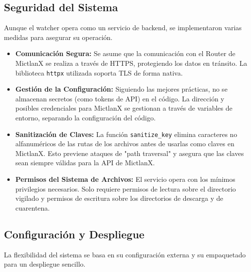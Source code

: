 \subsection{Seguridad del Sistema}
Aunque el watcher opera como un servicio de backend, se implementaron varias medidas para asegurar su operación.
\begin{itemize}
    \item \textbf{Comunicación Segura:} Se asume que la comunicación con el Router de MictlanX se realiza a través de HTTPS, protegiendo los datos en tránsito. La biblioteca \texttt{httpx} utilizada soporta TLS de forma nativa.
    \item \textbf{Gestión de la Configuración:} Siguiendo las mejores prácticas, no se almacenan secretos (como tokens de API) en el código. La dirección y posibles credenciales para MictlanX se gestionan a través de variables de entorno, separando la configuración del código.
    \item \textbf{Sanitización de Claves:} La función \texttt{sanitize\_key} elimina caracteres no alfanuméricos de las rutas de los archivos antes de usarlas como claves en MictlanX. Esto previene ataques de "path traversal" y asegura que las claves sean siempre válidas para la API de MictlanX.
    \item \textbf{Permisos del Sistema de Archivos:} El servicio opera con los mínimos privilegios necesarios. Solo requiere permisos de lectura sobre el directorio vigilado y permisos de escritura sobre los directorios de descarga y de cuarentena.
\end{itemize}

\subsection{Configuración y Despliegue}
La flexibilidad del sistema se basa en su configuración externa y su empaquetado para un despliegue sencillo.

